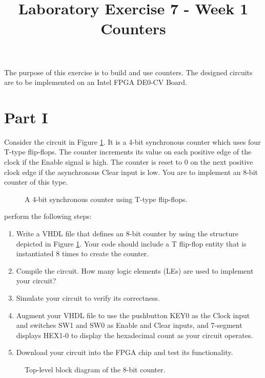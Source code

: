 \documentclass{article}
\title{Laboratory Exercise 7 - Week 1 \\ Counters}
\author{}
\date{}
\begin{document}
\maketitle

The purpose of this exercise is to build and use counters. The designed circuits are to be implemented on an Intel FPGA DE0-CV Board.

\section*{Part I}

Consider the circuit in Figure \ref{fig:counter_struct}. It is a 4-bit synchronous counter which uses four T-type flip-flops. The counter increments its value on each positive edge of the clock if the Enable signal is high. The counter is reset to 0 on the next positive clock edge if the asynchronous Clear input is low. You are to implement an 8-bit counter of this type.

\begin{figure}[H]
    \centering
    \resizebox{0.7\textwidth}{!}{}
    \caption{A 4-bit synchronous counter using T-type flip-flops.}
    \label{fig:counter_struct}
\end{figure}

perform the following steps:
\begin{enumerate}
    \item Write a VHDL file that defines an 8-bit counter by using the structure depicted in Figure \ref{fig:counter_struct}. Your code should include a T flip-flop entity that is instantiated 8 times to create the counter.
    \item Compile the circuit. How many logic elements (LEs) are used to implement your circuit?
    \item Simulate your circuit to verify its correctness.
    \item Augment your VHDL file to use the pushbutton KEY0 as the Clock input and switches SW1 and SW0 as Enable and Clear inputs, and 7-segment displays HEX1-0 to display the hexadecimal count as your circuit operates.
    \item Download your circuit into the FPGA chip and test its functionality.
\end{enumerate}

\begin{figure}[H]
    \centering
    \resizebox{0.7\textwidth}{!}{}
    \caption{Top-level block diagram of the 8-bit counter.}
    \label{fig:part1_top_level}
\end{figure}
\end{document}
